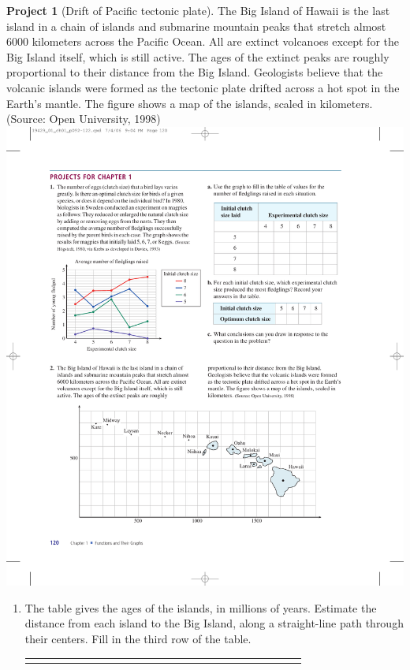 \documentclass[10pt,]{book}
\theoremstyle{plain}
\theoremstyle{definition}
\theoremstyle{definition}
\newtheorem{project}{Project}[chapter]
\theoremstyle{definition}
\theoremstyle{definition}
\numberwithin{equation}{part}
\newcommand{\hrulethin}  {\noalign{\hrule height 0.04em}}
\begin{document}
\begin{project}[Drift of Pacific tectonic plate]\label{project-2}
The Big Island of Hawaii is the last island in a chain of islands and submarine mountain peaks that stretch almost 6000 kilometers across the Pacific Ocean. All are extinct volcanoes except for the Big Island itself, which is still active. The ages of the extinct peaks are roughly proportional to their distance from the Big Island. Geologists believe that the volcanic islands were formed as the tectonic plate drifted across a hot spot in the Earth's mantle. The figure shows a map of the islands, scaled in kilometers. (Source: Open University, 1998) \includegraphics[width=1\linewidth]{images/fig-chap1-proj-2}
 \leavevmode%
\begin{enumerate}[label=*\alph**]
\item\hypertarget{li-1699}{}The table gives the ages of the islands, in millions of years. Estimate the distance from each island to the Big Island, along a straight-line path through their centers. Fill in the third row of the table. \leavevmode%
\begin{table}
\centering
\begin{tabular}{AlAcAcAcAcAcAcAcAcAcAcAcA}\hrulethin

\end{tabular}
\end{table}
\end{enumerate}
\end{project}
\end{document}

